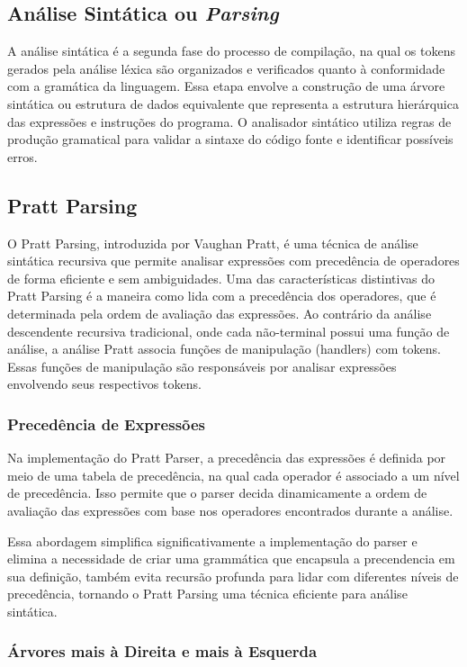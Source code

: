 \documentclass[english, 
               brazil, 
               bsc] %
               {dcomp-abntex2}
\begin{document}
\subsection{Análise Sintática ou \textit{Parsing}}
A análise sintática é a segunda fase do processo de compilação, na qual os tokens gerados pela análise léxica são organizados e verificados quanto à conformidade com a gramática da linguagem. Essa etapa envolve a construção de uma árvore sintática ou estrutura de dados equivalente que representa a estrutura hierárquica das expressões e instruções do programa. O analisador sintático utiliza regras de produção gramatical para validar a sintaxe do código fonte e identificar possíveis erros.

\subsection{Pratt Parsing}
O Pratt Parsing, introduzida por Vaughan Pratt, é uma técnica de análise sintática recursiva que permite analisar expressões com precedência de operadores de forma eficiente e sem ambiguidades. Uma das características distintivas do Pratt Parsing é a maneira como lida com a precedência dos operadores, que é determinada pela ordem de avaliação das expressões. Ao contrário da análise descendente recursiva tradicional, onde cada não-terminal possui uma função de análise, a análise Pratt associa funções de manipulação (handlers) com tokens. Essas funções de manipulação são responsáveis por analisar expressões envolvendo seus respectivos tokens.

\subsubsection{Precedência de Expressões}

Na implementação do Pratt Parser, a precedência das expressões é definida por meio de uma tabela de precedência, na qual cada operador é associado a um nível de precedência. Isso permite que o parser decida dinamicamente a ordem de avaliação das expressões com base nos operadores encontrados durante a análise.

Essa abordagem simplifica significativamente a implementação do parser e elimina a necessidade de criar uma grammática que encapsula a precendencia em sua definição, também evita recursão profunda para lidar com diferentes níveis de precedência, tornando o Pratt Parsing uma técnica eficiente para análise sintática.

\subsubsection{Árvores mais à Direita e mais à Esquerda}
\end{document}
